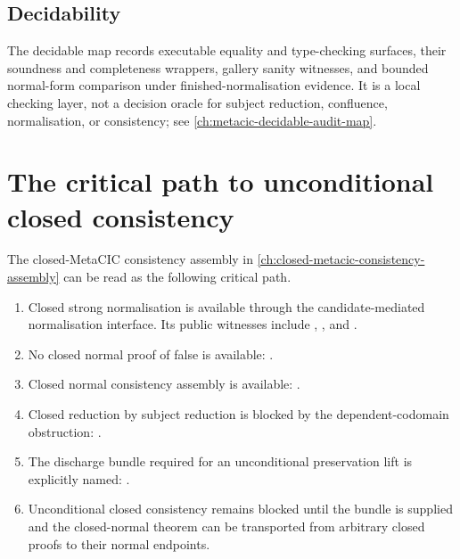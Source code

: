 \subsection{Decidability}
\label{subsec:metacic-audit-synthesis-decidability}

The decidable map records executable equality and type-checking surfaces, their
soundness and completeness wrappers, gallery sanity witnesses, and bounded
normal-form comparison under finished-normalisation evidence. It is a local
checking layer, not a decision oracle for subject reduction, confluence,
normalisation, or consistency; see
\autoref{ch:metacic-decidable-audit-map}.

\section{The critical path to unconditional closed consistency}
\label{sec:metacic-audit-synthesis-critical-path}

The closed-MetaCIC consistency assembly in
\autoref{ch:closed-metacic-consistency-assembly} can be read as the following
critical path.

\begin{enumerate}
\item Closed strong normalisation is available through the candidate-mediated
  normalisation interface. Its public witnesses include
  ,
  ,
  and
  .
\item No closed normal proof of false is available:
  .
\item Closed normal consistency assembly is available:
  .
\item Closed reduction by subject reduction is blocked by the dependent-codomain
  obstruction:
  .
\item The discharge bundle required for an unconditional preservation lift is
  explicitly named:
  .
\item Unconditional closed consistency remains blocked until the bundle is
  supplied and the closed-normal theorem can be transported from arbitrary
  closed proofs to their normal endpoints.
\end{enumerate}

